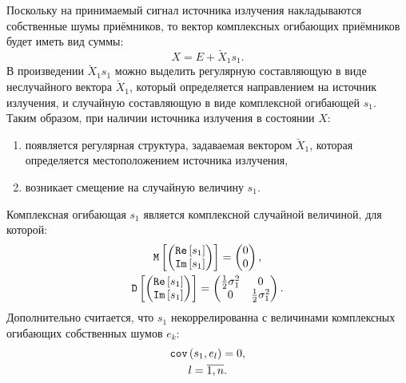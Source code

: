 Поскольку на принимаемый сигнал источника излучения накладываются собственные шумы приёмников, то вектор комплексных огибающих приёмников будет иметь вид суммы:
\begin{equation}
    \label{jammers:single:state}
    X = E + \breve{X}_1 s_1.
\end{equation}
В произведении $\breve{X}_1 s_1$ можно выделить регулярную составляющую в виде неслучайного вектора $\breve{X}_1$, который определяется направлением на источник излучения,
и случайную составляющую в виде комплексной огибающей $s_1$. Таким образом, при наличии источника излучения в состоянии $X$:
\begin{enumerate}
    \item появляется регулярная структура, задаваемая вектором $\breve{X}_1$, которая определяется местоположением источника излучения,
    \item возникает смещение на случайную величину $s_1$.
\end{enumerate}
Комплексная огибающая $s_1$ является комплексной случайной величиной, для которой:
\begin{gather*}
    \mathtt{M} \left [ 
        \begin{pmatrix}
            \mathtt{Re} \left [ s_1 \right ] \\ \mathtt{Im} \left [ s_1 \right ]
        \end{pmatrix}
     \right ] =
    \begin{pmatrix}
        0 \\
        0
    \end{pmatrix} , \\
    \mathtt{D} \left [ 
        \begin{pmatrix}
            \mathtt{Re} \left [ s_1 \right ] \\ \mathtt{Im} \left [ s_1 \right ]
        \end{pmatrix}
     \right ] =
    \begin{pmatrix}
        \frac{1}{2} \sigma_1^2 & 0                      \\
        0                      & \frac{1}{2} \sigma_1^2
    \end{pmatrix} .
\end{gather*}
Дополнительно считается, что $s_1$ некоррелированна с величинами комплексных огибающих собственных шумов $e_k$:
\begin{gather*}
    \mathtt{cov} \left ( s_1, e_l \right ) = 0 , \\
    l = \overline{1, n}.
\end{gather*}

